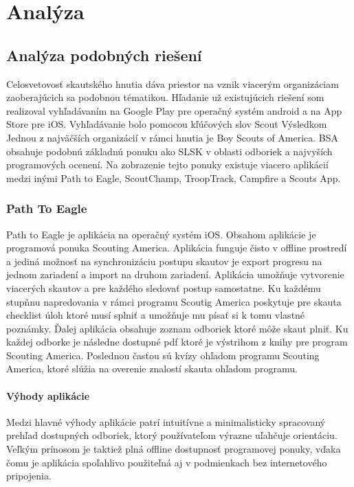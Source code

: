 \chapter{Analýza}



\section{Analýza podobných riešení}
Celosvetovosť skautského hnutia dáva priestor na vznik viacerým organizáciam zaoberajúcich sa podobnou tématikou. Hľadanie už existujúcich riešení som realizoval vyhľadávaním na Google Play pre operačný systém android a na App Store pre iOS. Vyhľadávanie bolo pomocou kľúčových slov Scout Výsledkom  Jednou z najväčších organizácií v rámci hnutia je Boy Scouts of America. BSA obsahuje podobnú základnú ponuku ako SLSK v oblasti odboriek a najvyších programových ocenení. Na zobrazenie tejto ponuky existuje viacero aplikácií medzi inými Path to Eagle, ScoutChamp, TroopTrack, Campfire a Scouts App.

% 

\subsection{Path To Eagle}
Path to Eagle je aplikácia na operačný systém iOS. Obsahom aplikácie je programová ponuka Scouting America. Aplikácia funguje čisto v offline prostredí a jediná možnosť na synchronizáciu postupu skautov je export progresu na jednom zariadení a import na druhom zariadení. Aplikácia umožňuje vytvorenie viacerých skautov a pre každého sledovať postup samostatne. Ku každému stupňnu napredovania v rámci programu Scoutig America poskytuje pre skauta checklist úloh ktoré musí splniť a umožňuje mu písať si k tomu vlastné poznámky. Ďalej aplikácia obsahuje zoznam odboriek ktoré môže skaut plniť. Ku každej odborke je následne dostupné pdf ktoré je výstrihom z knihy pre program Scouting America. Poslednou časťou sú kvízy ohľadom programu Scouting America, ktoré slúžia na overenie znalostí skauta ohľadom programu. 

\subsubsection{Výhody aplikácie}
Medzi hlavné výhody aplikácie patrí intuitívne a minimalisticky spracovaný prehľad dostupných odboriek, ktorý používateľom výrazne uľahčuje orientáciu. Veľkým prínosom je taktiež plná offline dostupnosť programovej ponuky, vďaka čomu je aplikácia spoľahlivo použiteľná aj v podmienkach bez internetového pripojenia.

